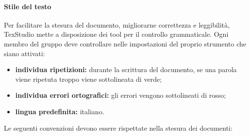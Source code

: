                 \paragraph{Stile del testo}
                Per facilitare la stesura del documento, migliorarne correttezza e leggibilità, TexStudio mette a disposizione dei tool per il controllo grammaticale. Ogni membro del gruppo deve controllare nelle impostazioni del proprio strumento che siano attivati:
                \begin{itemize}
                	\item \textbf{individua ripetizioni:} durante la scrittura del documento, se una parola viene ripetuta troppo viene sottolineata di verde;
                	\item \textbf{individua errori ortografici:} gli errori vengono sottolineati di rosso;
                	\item \textbf{lingua predefinita:} italiano.
                \end{itemize}
                Le seguenti convenzioni devono essere rispettate nella stesura dei documenti:
